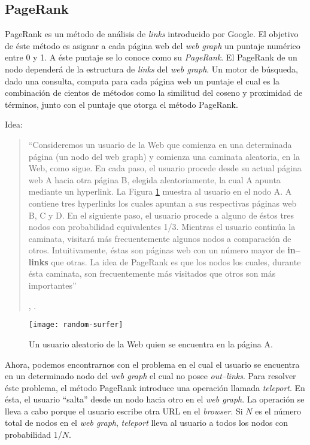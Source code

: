 	\subsection{PageRank}
		PageRank es un método de análisis de \textit{links} introducido por Google. El objetivo de éste método es asignar a cada página web del \textit{web graph} un puntaje numérico entre 0 y 1. A éste puntaje se lo conoce como su \textit{PageRank}. El PageRank de un nodo dependerá de la estructura de \textit{links} del \textit{web graph}. Un motor de búsqueda, dado una consulta, computa para cada página web un puntaje el cual es la combinación de cientos de métodos como la similitud del coseno y proximidad de términos, junto con el puntaje que otorga el método PageRank. \par
		
		Idea:
		\begin{quote}
			\begin{itshape}
				\enquote{Consideremos un usuario de la Web que comienza en una determinada página (un nodo del web graph) y comienza una caminata aleatoria, en la Web, como sigue. En cada paso, el usuario procede desde su actual página web A hacia otra página B, elegida aleatoriamente, la cual A apunta mediante un hyperlink. La Figura \ref{fig:random-surfer} muestra al usuario en el nodo A. A contiene tres hyperlinks los cuales apuntan a sus respectivas páginas web B, C y D. En el siguiente paso, el usuario procede a alguno de éstos tres nodos con probabilidad equivalentes 1/3. Mientras el usuario continúa la caminata, visitará más frecuentemente algunos nodos a comparación de otros. Intuitivamente, éstas son páginas web con un número mayor de \textbf{in--links} que otras. La idea de PageRank es que los nodos los cuales, durante ésta caminata, son frecuentemente más visitados que otros son más importantes}
			\end{itshape}, \cite{manning2009}.
		\end{quote}
		
		\begin{figure}[]
			\centering
			\texttt{[image: random-surfer]}
			\caption{Un usuario aleatorio de la Web quien se encuentra en la página A.}
			\label{fig:random-surfer}
		\end{figure}
		
		
		Ahora, podemos encontrarnos con el problema en el cual el usuario se encuentra en un determinado nodo del \textit{web graph} el cual no posee \textit{out--links}. Para resolver éste problema, el método PageRank introduce una operación llamada \textit{teleport}. En ésta, el usuario \enquote{salta} desde un nodo hacia otro en el \textit{web graph}. La operación se lleva a cabo porque el usuario escribe otra URL en el \textit{browser}. Si $N$ es el número total de nodos en el \textit{web graph}, \textit{teleport} lleva al usuario a todos los nodos con probabilidad 1/$N$. \par
		
